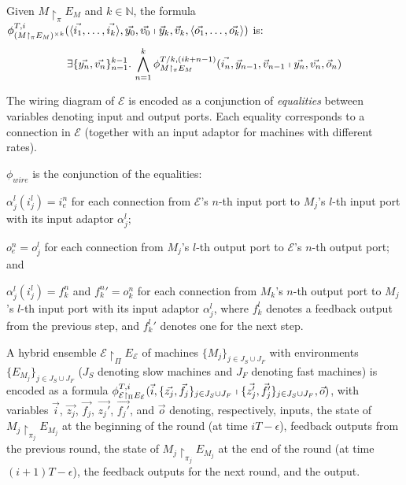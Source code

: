 \begin{definition}
Given $M \restriction_\pi E_M$ and $k \in \mathbb{N}$,
the formula
$\phi_{(M \restriction_\pi E_M)^{\times k}}^{T,
  i}(\langle\vec{i_1},\ldots,\vec{i_k}\rangle, \vec{y_0}, \vec{v_0}
\shortmid \vec{y}_{k}, \vec{v}_{k},
\langle\vec{o_1},\ldots,\vec{o_k}\rangle)$ is: 
\[
\exists\{\vec{y_n}, \vec{v_n}\}_{n=1}^{k-1}.\,
\bigwedge_{n=1}^k \phi_{M \restriction_\pi E_M}^{T/k,(ik+n-1)}(\vec{i_n}, \vec{y}_{n-1}, \vec{v}_{n-1} \shortmid \vec{y_{n}}, \vec{v_{n}}, \vec{o}_n)
\]
\end{definition}

The wiring diagram of $\mathcal{E}$ is encoded as
a conjunction of %
\emph{equalities} between variables denoting input and output ports.
Each equality corresponds to a connection in $\mathcal{E}$
(together with an input adaptor for machines with different rates).


\begin{definition}
$\phi_\mathit{wire}$ is the conjunction of the equalities:
\begin{inparaenum}[(i)]
	\item $\alpha_j^l(i_j^l) = i_e^n$
	for each connection from $\mathcal{E}$'s $n$-th input port to $M_j$'s $l$-th input port 
	with its input adaptor $\alpha_j^l$;
	\item $o_e^n = o_j^l$
	for each connection from $M_j$'s $l$-th output port to $\mathcal{E}$'s $n$-th output port; and
	\item $\alpha_j^l(i_j^l) = f_k^n$ and ${f_k^n}' = o_k^n$
	for each connection from $M_k$'s $n$-th output port to $M_j$'s $l$-th input port with its input adaptor $\alpha_j^l$,
	where $f_k^l$ denotes a feedback output from the previous step, 
	and ${f_k^l}'$ denotes one for the next step.
\end{inparaenum}
\end{definition}


A hybrid ensemble $\mathcal{E} \restriction_{\Pi} E_\mathcal{E}$ 
of machines  $\{M_j\}_{j\in J_S\cup J_F}$ with %
environments $\{E_{M_j}\}_{j\in J_S\cup J_F}$
($J_S$ denoting slow machines and $J_F$ denoting fast machines) is
encoded as a formula 
$\phi_{\mathcal{E} \restriction_{\Pi} E_\mathcal{E}}^{T,i}(
	\vec{i}, \{\vec{z_j},\vec{f_j}\}_{j\in J_S\cup J_F}
	\shortmid 
	\{\vec{z'_j}, \vec{f_j'}\}_{j\in J_S\cup J_F}, \vec{o})$,
%
with variables $\vec{i}$, $\vec{z_j}$, $\vec{f_j}$, $\vec{z_j'}$,
$\vec{f_j'}$, and $\vec{o}$ denoting, respectively, 
inputs, the state of $M_j \restriction_{\pi_j} E_{M_j}$ at the beginning of the round 
		(at time $iT - \epsilon$),
feedback outputs from the previous round,
	the  state of $M_j \restriction_{\pi_j} E_{M_j}$ at the end of the round 
		(at time $(i+1)T - \epsilon$), 
the feedback outputs for the next round,	and 
the output.



